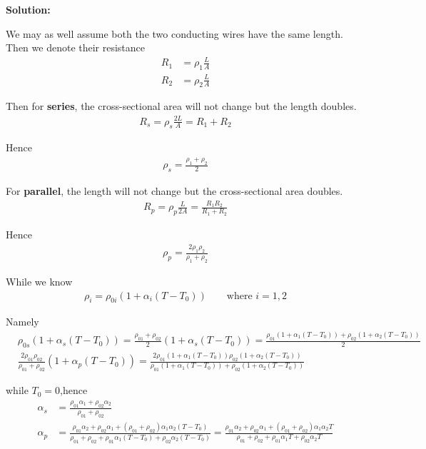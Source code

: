 \documentclass[a4paper, 11pt]{article}
\newenvironment{solution}
    {\textbf{Solution:}}
    {}
\begin{document}
\begin{solution}
	\par We may as well assume both the two conducting wires have the same length. Then we denote their resistance
	\begin{align*}
		R_1 & = \rho_{1} \frac{L}{A} \\
		R_2 & = \rho_{2} \frac{L}{A}
	\end{align*}

	Then for \textbf{series}, the cross-sectional area will not change but the length doubles.
	\begin{align*}
		R_s = \rho_s \frac{2L}{A} = R_1 + R_2
	\end{align*}

	Hence
	\begin{align}
		\label{series}
		\rho_s = \frac{\rho_{1} + \rho_{2}}{2}
	\end{align}

	For \textbf{parallel}, the length will not change but the cross-sectional area doubles.
	\begin{align*}
		R_p = \rho_p \frac{L}{2A} = \frac{R_1R_2}{R_1+R_2}
	\end{align*}

	Hence
	\begin{align}
		\rho_p = \frac{2\rho_{1}\rho_{2}}{\rho_{1} + \rho_{2}}
	\end{align}

	While we know
	\begin{align}
		\rho_i = \rho_{0i}(1 + \alpha_i(T - T_0)) \qquad \text{where } i = 1,2
	\end{align}

	Namely
	\begin{align*}
		 & \rho_{0s}(1+\alpha_s(T-T_0)) = \frac{\rho_{01} + \rho_{02}}{2}(1+\alpha_s(T-T_0)) = \frac{\rho_{01}(1+\alpha_1(T-T_0)) + \rho_{02}(1+\alpha_2(T-T_0))}{2}                                        \\
		 & \frac{2\rho_{01}\rho_{02}}{\rho_{01}+\rho_{02}}(1+\alpha_p(T-T_0)) = \frac{2\rho_{01}(1+\alpha_1(T-T_0))\rho_{02}(1+\alpha_2(T-T_0))}{\rho_{01}(1+\alpha_1(T-T_0))+\rho_{02}(1+\alpha_2(T-T_0))}
	\end{align*}

	while $T_0 = 0$,hence
	\begin{align}
		\alpha_s & = \frac{\rho_{01}\alpha_1 + \rho_{02}\alpha_2}{\rho_{01} + \rho_{02}}                                                                                            \\
		\alpha_p & = \frac{\rho_{01}\alpha_2+\rho_{02}\alpha_1+(\rho_{01}+\rho_{02})\alpha_1\alpha_2(T-T_0)}{\rho_{01}+\rho_{02}+\rho_{01}\alpha_1(T-T_0)+\rho_{02}\alpha_2(T-T_0)}
		= \frac{\rho_{01}\alpha_2+\rho_{02}\alpha_1+(\rho_{01}+\rho_{02})\alpha_1\alpha_2T}{\rho_{01}+\rho_{02}+\rho_{01}\alpha_1T+\rho_{02}\alpha_2T}
	\end{align}

\end{solution}
\end{document}
